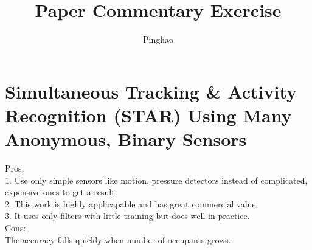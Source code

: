 \documentclass[a4paper]{article}
\title{Paper Commentary Exercise}
\author{Pinghao}
\begin{document}
\maketitle

\section{Simultaneous Tracking & Activity Recognition (STAR)
Using Many Anonymous, Binary Sensors}

Pros:\\

1. Use only simple sensors like motion, pressure detectors instead of complicated, expensive ones to get a result.\\

2. This work is highly applicapable and has great commercial value.\\

3. It uses only filters with little training but does well in  practice.\\ 

Cons:\\

The accuracy falls quickly when number of occupants grows.\\


\end{document}
